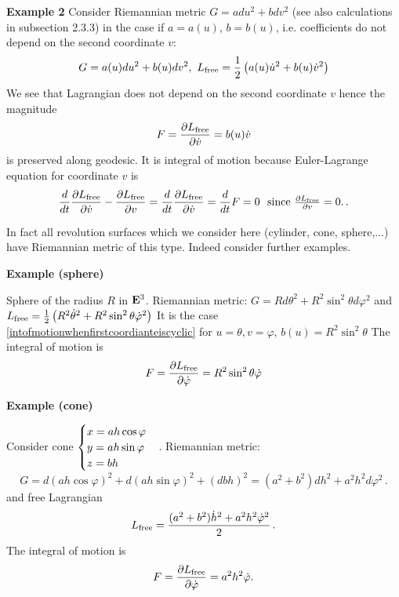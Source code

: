 \documentclass[12pt]{article}
\theoremstyle{theorem}
\numberwithin{equation}{section}
\begin{document}
{\m


  {\bf Example 2}  Consider Riemannian metric $G=adu^2+bdv^2$ (see also calculations in subsection 2.3.3)
   in the case if $a=a(u)$, $b=b(u)$, i.e. coefficients do not depend on the second coordinate  $v$:
                \begin{equation}\label{intofmotionwhenfirstcoordianteiscyclic}
G=a(u)du^2+b(u)dv^2,\,\, L_{\rm free}={1\over 2}\left(a(u)\dot u^2+b(u)\dot v^2\right)
                \end{equation}
 We see that Lagrangian does not depend on the second coordinate $v$ hence the magnitude
      \begin{equation}\label{cyclicintegra2}
        F={\partial L_{\rm free}\over \partial \dot v}=b(u)\dot v
      \end{equation}
  is preserved along geodesic. It
   is integral of motion because Euler-Lagrange equation for coordinate $v$ is
    $$
 {d\over dt}{\partial L_{\rm free}\over \partial\dot v}-{\partial L_{\rm free}\over \partial v}=
 {d\over dt}{\partial L_{\rm free}\over \partial\dot v}={d\over dt}F=0\,\,
 \hbox{ since ${\partial L_{\rm free}\over \partial v}=0$.}\,.
 $$


 \m

 In fact all revolution surfaces which we consider here (cylinder, cone, sphere,...) have Riemannian
 metric of this type.
 Indeed consider further examples.

 {\bf Example (sphere)}

 Sphere of the radius $R$ in ${\bf E}^3$. Riemannian metric:
$G=Rd\theta^2+R^2\sin^2\theta d\varphi^2$ and
$L_{\rm free}={1\over 2}\left(R^2\dot \theta^2+R^2\sin^2\theta\dot \varphi^2\right) $
It is the case \eqref{intofmotionwhenfirstcoordianteiscyclic} for $u=\theta,v=\varphi$, $b(u)=R^2\sin^2\theta$
                The integral of motion is
                 $$
           F={\partial L_{\rm free}\over \partial \dot\varphi}=R^2\sin^2\theta\dot\varphi
                 $$

 \m

{\bf Example (cone)}

Consider cone $\begin{cases}x=ah\cos\varphi\cr y=ah\sin\varphi \cr z=bh\cr\end{cases}$. Riemannian metric:
                          $$
                          G=d(ah\cos\varphi)^2+d(ah\sin\varphi)^2+(dbh)^2=
                          (a^2+b^2)dh^2+a^2h^2d\varphi^2\,.
                          $$
and free Lagrangian
                 $$
L_{\rm free}={(a^2+b^2)\dot h^2+a^2h^2\dot\varphi^2\over 2}\,.
                  $$
The integral of motion is
                 $$
           F={\partial L_{\rm free}\over \partial \dot\varphi}=a^2h^2\dot\varphi.
                 $$
  \m

}
\end{document}
